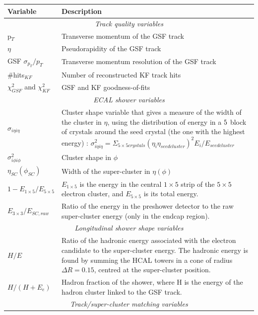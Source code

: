 \begin{center}
\begin{longtable}{|l|p{11cm}|}
\hline
	\textbf{Variable} & \textbf{Description} \\
\hline	
	\multicolumn{2}{|c|}{\emph{Track quality variables}}  \\
\hline
	p$_T$ & Transverse momentum of the GSF track \\
	$\eta$ & Pseudorapidity of the GSF track \\
	GSF $\sigma_{p_T}/p_T$ & Transverse momentum resolution of the GSF track \\
	\#hits$_{KF}$ & Number of reconstructed KF track hits \\
	$\chi^2_{GSF}$ and $\chi^2_{KF}$ & GSF and KF goodness-of-fits \\
\hline	
	\multicolumn{2}{|c|}{\emph{ECAL shower variables}} \\
\hline	
	$\sigma_{i \eta i \eta}$ & Cluster shape variable that gives a measure of the width of the cluster in $\eta$, using the distribution of energy in a $5 \time 5$ block of crystals around the seed crystal (the one with the highest energy) \cite{Baffioni:2006cd}: $\sigma^2_{i \eta i \eta} = \Sigma_{5 \times 5 crystals} (\eta_i \eta_{seed cluster})^2 E_i/E_{seed cluster}$ \\
	$\sigma^2_{i \phi i \phi}$ & Cluster shape in $\phi$ \\
	$\eta_{SC}(\phi_{SC})$ & Width of the super-cluster in $\eta (\phi)$ \\
	$1-E_{1 \times 5}/E_{5 \times 5}$ & $E_{1 \times 5}$ is the energy in the central $1 \times 5$ strip of the $5 \times 5$ electron cluster, and $E_{5 \times 5}$ is its total energy. \\
	$E_{3 \times 3}/E_{SC,raw}$ & Ratio of the energy in the preshower detector to the raw super-cluster energy (only in the endcap region). \\
\hline	
	\multicolumn{2}{|c|}{\emph{Longitudinal shower shape variables}} \\
\hline	
	$H/E$ & Ratio of the hadronic energy associated with the electron candidate to the super-cluster energy. The hadronic energy is found by summing the HCAL towers in a cone of radius $\Delta R = 0.15$, centred at the super-cluster position. \\
	$H/(H+E_{e})$ & Hadron fraction of the shower, where H is the energy of the hadron cluster linked to the GSF track.\\
\hline	
	\multicolumn{2}{|c|}{\emph{Track/super-cluster matching variables}}\\

\end{longtable}
\end{center}
